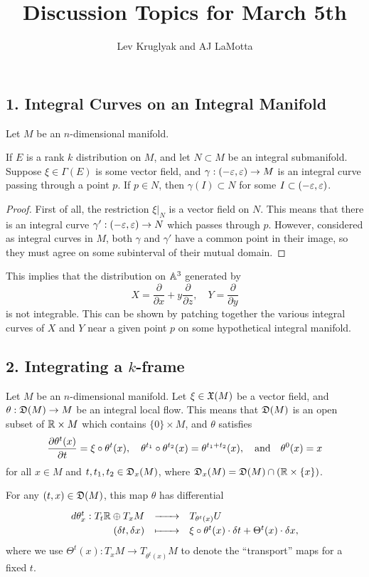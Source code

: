 \documentclass{lkx_paper}
\title{\textbf{Discussion Topics for March 5th}}
\date{}
\author{Lev Kruglyak and AJ LaMotta}
\begin{document}
\maketitle

\subsection*{1. Integral Curves on an Integral Manifold}

Let $M$ be an $n$-dimensional manifold.
\begin{claim*}
	If $E$ is a rank $k$ distribution on $M$, and let $N\subset M$ be an integral submanifold. Suppose $\xi\in \Gamma(E)$ is some vector field, and $\gamma : (-\varepsilon, \varepsilon) \to M$ is an integral curve passing through a point $p$. If $p\in N$, then $\gamma(I)\subset N$ for some $I\subset (-\varepsilon, \varepsilon)$.
\end{claim*}

\begin{proof}
	First of all, the restriction $\xi|_N$ is a vector field on $N$. This means that there is an integral curve $\gamma' : (-\varepsilon, \varepsilon) \to N$ which passes through $p$. However, considered as integral curves in $M$, both $\gamma$ and $\gamma'$ have a common point in their image, so they must agree on some subinterval of their mutual domain.
\end{proof}

This implies that the distribution on $\mathbb{A}^3$ generated by
\[
	X = \frac{\partial}{\partial x} + y\frac{\partial}{\partial z},\quad Y = \frac{\partial}{\partial y}
\]
is not integrable. This can be shown by patching together the various integral curves of $X$ and $Y$ near a given point $p$ on some hypothetical integral manifold.

\subsection*{2. Integrating a $k$-frame}

Let $M$ be an $n$-dimensional manifold.
Let $\xi\in \mathfrak{X}(M)$ be a vector field, and $\theta : \mathfrak{D}(M) \to M$ be an integral local flow. This means that $\mathfrak{D}(M)$ is an open subset of $\mathbb{R}\times M$ which contains $\{0\}\times M$, and $\theta$ satisfies
\[
	\frac{\partial \theta^{t}(x)}{\partial t} = \xi\circ\theta^{t}(x),\quad\theta^{t_1}\circ \theta^{t_2}(x) = \theta^{t_1+t_2}(x),\quad\textrm{and}\quad\theta^{0}(x)=x
\]
for all $x\in M$ and $t,t_1,t_2\in \mathfrak{D}_x(M)$, where $\mathfrak{D}_x(M) = \mathfrak{D}(M)\cap (\mathbb{R}\times\{x\})$.

For any $(t,x)\in \mathfrak{D}(M)$, this map $\theta$ has differential
\[
	\definefunction{d\theta^t_x}
	{T_t \R\oplus T_x M}
	{T_{\theta^{t}(x)}U}
	{(\delta t, \delta x)}
	{\xi\circ\theta^{t}(x)\cdot \delta t + \Theta^{t}(x)\cdot \delta x,}
\]
where we use $\Theta^{t}(x) : T_x M \to T_{\theta^{t}(x)} M$ to denote the ``transport'' maps for a fixed $t$.
\end{document}
